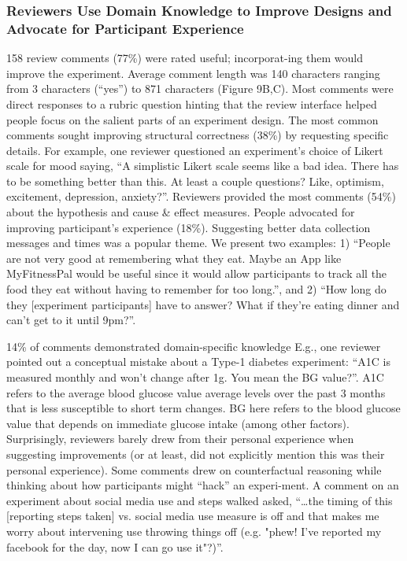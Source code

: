 \subsubsection{Reviewers Use Domain Knowledge to Improve Designs and Advocate for Participant Experience}
158 review comments (77\%) were rated useful; incorporat-ing them would improve the experiment. Average comment length was 140 characters ranging from 3 characters (“yes”) to 871 characters (Figure 9B,C). Most comments were direct responses to a rubric question hinting that the review interface helped people focus on the salient parts of an experiment design.
The most common comments sought improving structural correctness (38\%) by requesting specific details. For example, one reviewer questioned an experiment’s choice of Likert scale for mood saying, “A simplistic Likert scale seems like a bad idea. There has to be something better than this. At least a couple questions? Like, optimism, excitement, depression, anxiety?”. Reviewers provided the most comments (54\%) about the hypothesis and cause \& effect measures. People advocated for improving participant’s experience (18\%). Suggesting better data collection messages and times was a popular theme. We present two examples: 1) “People are not very good at remembering what they eat. Maybe an App like MyFitnessPal would be useful since it would allow participants to track all the food they eat without having to remember for too long.”, and 2) “How long do they [experiment participants] have to answer? What if they're eating dinner and can't get to it until 9pm?”.

14\% of comments demonstrated domain-specific knowledge E.g., one reviewer pointed out a conceptual mistake about a Type-1 diabetes experiment: “A1C is measured monthly and won't change after 1g. You mean the BG value?”. A1C refers to the average blood glucose value average levels over the past 3 months that is less susceptible to short term changes. BG here refers to the blood glucose value that depends on immediate glucose intake (among other factors). Surprisingly, reviewers barely drew from their personal experience when suggesting improvements (or at least, did not explicitly mention this was their personal experience). Some comments drew on counterfactual reasoning while thinking about how participants might “hack” an experi-ment. A comment on an experiment about social media use and steps walked asked, “…the timing of this [reporting steps taken] vs. social media use measure is off and that makes me worry about intervening use throwing things off (e.g. "phew! I've reported my facebook for the day, now I can go use it"?)”. 


